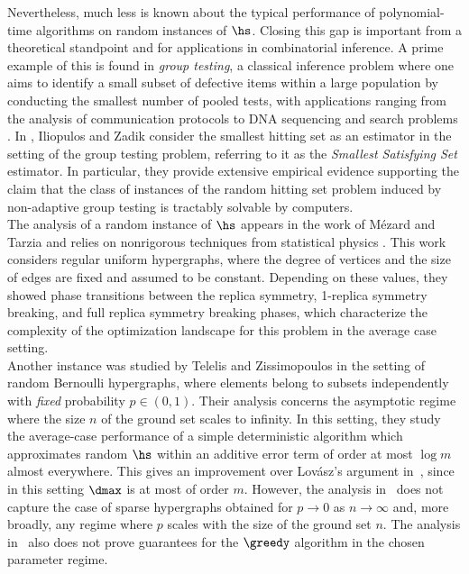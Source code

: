 \noindent
Nevertheless, much less is known about the typical performance of polynomial-time algorithms on random instances of $\hs$. Closing this gap is important from a theoretical standpoint and for applications in combinatorial inference. A prime example of this is found in \emph{group testing}, a classical inference problem where one aims to identify a small subset of defective items within a large population by conducting the smallest number of pooled tests, with applications ranging from the analysis of communication protocols \cite{fernandez2013unbounded} to DNA sequencing \cite{erlich2015biological} and search problems \cite{du2000combinatorial}. In \cite{iliopoulos2021group}, Iliopulos and Zadik consider the smallest hitting set as an estimator in the setting of the group testing problem, referring to it as the \emph{Smallest Satisfying Set} estimator. In particular, they provide extensive empirical evidence supporting the claim that the class of instances of the random hitting set problem induced by non-adaptive group testing is tractably solvable by computers. \\
\noindent
The analysis of a random instance of $\hs$ appears in the work of M\'ezard and Tarzia and relies on nonrigorous techniques from statistical physics \cite{mezard2007statistical}. This work considers regular uniform hypergraphs, where the degree of vertices and the size of edges are fixed and assumed to be constant. Depending on these values, they showed phase transitions between the replica symmetry, 1-replica symmetry breaking, and full replica symmetry breaking phases, which characterize the complexity of the optimization landscape for this problem in the average case setting.\\
\noindent
Another instance was studied by Telelis and Zissimopoulos \cite{telelis2005absolute} in the setting of random Bernoulli hypergraphs, where elements belong to subsets independently with \emph{fixed} probability $p\in(0,1)$. Their analysis concerns the asymptotic regime where the size $n$ of the ground set scales to infinity. In this setting, they study the average-case performance of a simple deterministic algorithm which approximates random $\hs$ within an additive error term of order at most $\log m$ almost everywhere. This gives an improvement over Lovász's argument in~\cite{lovasz1975ratio}, since in this setting $\dmax$ is at most of order $m$. However, the analysis in~\cite{telelis2005absolute} does not capture the case of sparse hypergraphs obtained for $p \to 0$ as $n \to \infty$ and, more broadly, any regime where $p$ scales with the size of the ground set $n$. The analysis in~\cite{telelis2005absolute} also does not prove guarantees for the $\greedy$ algorithm in the chosen parameter regime. \\ %
